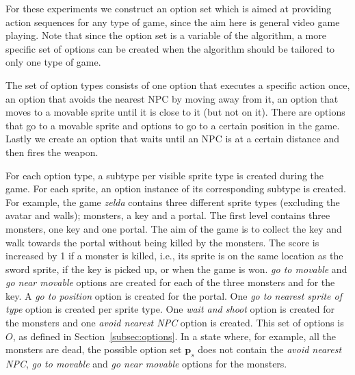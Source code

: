 For these experiments we construct an option set which is aimed at providing
action sequences for any type of game, since the aim here is general video game
playing.  Note that since the option set is a variable of the algorithm, a more
specific set of options can be created when the algorithm should be tailored to
only one type of game.

The set of option types consists of one option that executes a specific action
once, an option that avoids the nearest NPC by moving away from it, an option
that moves to a movable sprite until it is close to it (but not on it). There
are options that go to a movable sprite and options to go to a certain position
in the game.  Lastly we create an option that waits until an NPC is at a certain
distance and then fires the weapon.

For each option type, a subtype per visible sprite type is created during the
game. For each sprite, an option instance of its corresponding subtype is
created. For example, the game \textit{zelda} contains three different sprite
types (excluding the avatar and walls); monsters, a key and a portal. The first
level contains three monsters, one key and one portal. The aim of the game is to
collect the key and walk towards the portal without being killed by the
monsters. The score is increased by 1 if a monster is killed, i.e., its sprite
is on the same location as the sword sprite, if the key is picked up, or when
the game is won.  \emph{go to movable} and \emph{go near movable} options are
created for each of the three monsters and for the key. A \emph{go to position}
option is created for the portal.  One \emph{go to nearest sprite of type}
option is created per sprite type. One \emph{wait and shoot} option is created
for the monsters and one \emph{avoid nearest NPC} option is created. This set of
options is $O$, as defined in Section~\ref{subsec:options}. In a state where,
for example, all the monsters are dead, the possible option set $\mathbf{p}_s$
does not contain the \emph{avoid nearest NPC}, \emph{go to movable} and \emph{go
near movable} options for the monsters.

